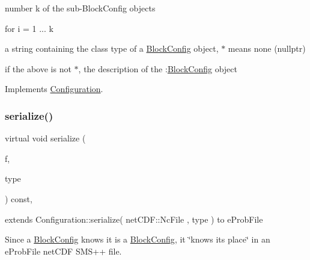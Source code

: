 number k of the sub-\/\+Block\+Config objects

for i = 1 ... k
\begin{DoxyItemize}
\item a string containing the class type of a \mbox{\hyperlink{class_s_m_spp__di__unipi__it_1_1_block_config}{Block\+Config}} object, \textquotesingle{}$\ast$\textquotesingle{} means none (nullptr)
\item if the above is not \textquotesingle{}$\ast$\textquotesingle{}, the description of the \+:\mbox{\hyperlink{class_s_m_spp__di__unipi__it_1_1_block_config}{Block\+Config}} object 
\end{DoxyItemize}

Implements \mbox{\hyperlink{class_s_m_spp__di__unipi__it_1_1_configuration_a27ae9e4279482d52342c7958c34a43c6}{Configuration}}.

\mbox{\label{class_s_m_spp__di__unipi__it_1_1_block_config_a978c6b5919ce07663f3c325a99013bac}} 
\subsubsection{\texorpdfstring{serialize()}{serialize()}\hspace{0.1cm}{\footnotesize\ttfamily [1/2]}}
{\footnotesize\ttfamily virtual void serialize (\begin{DoxyParamCaption}\item[{net\+C\+D\+F\+::\+Nc\+File \&\&}]{f,  }\item[{const int}]{type }\end{DoxyParamCaption}) const\hspace{0.3cm}{\ttfamily [override]}, {\ttfamily [virtual]}}



extends Configuration\+::serialize( net\+C\+D\+F\+::\+Nc\+File , type ) to e\+Prob\+File 

Since a \mbox{\hyperlink{class_s_m_spp__di__unipi__it_1_1_block_config}{Block\+Config}} knows it is a \mbox{\hyperlink{class_s_m_spp__di__unipi__it_1_1_block_config}{Block\+Config}}, it \char`\"{}knows its place\char`\"{} in an e\+Prob\+File net\+C\+DF S\+M\+S++ file. 

